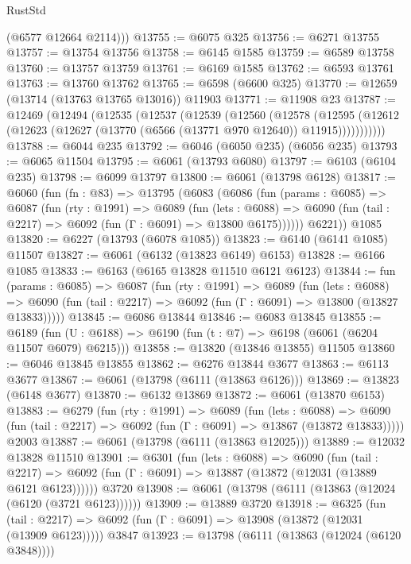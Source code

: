 \begin{lexlean}{RustStd}
\begin{coremodule}
{\begin{coremodule}
{{{{{{{{{{{{{{{{{{{{{{{{{{        (@6577 @12664 @2114)))
@13755 := @6075 @325
@13756 := @6271 @13755
@13757 := @13754 @13756
@13758 := @6145 @1585
@13759 := @6589 @13758
@13760 := @13757 @13759
@13761 := @6169 @1585
@13762 := @6593 @13761
@13763 := @13760 @13762
@13765 := @6598 (@6600 @325)
@13770 := @12659 (@13714 (@13763 @13765 @13016)) @11903
@13771 := @11908 @23
@13787 := @12469
    (@12494
      (@12535
        (@12537
          (@12539
            (@12560
              (@12578
                (@12595
                  (@12612 (@12623 (@12627 (@13770 (@6566 (@13771 @970 @12640)) @11915)))))))))))
@13788 := @6044 @235
@13792 := @6046 (@6050 @235) (@6056 @235)
@13793 := @6065 @11504
@13795 := @6061 (@13793 @6080)
@13797 := @6103 (@6104 @235)
@13798 := @6099 @13797
@13800 := @6061 (@13798 @6128)
@13817 := @6060
    (fun (fn : @83) =>
    @13795
      (@6083
        (@6086
          (fun (params : @6085) =>
          @6087
            (fun (rty : @1991) =>
            @6089
              (fun (lets : @6088) =>
              @6090 (fun (tail : @2217) => @6092 (fun (Γ : @6091) => @13800 @6175))))))
        @6221))
    @1085
@13820 := @6227 (@13793 (@6078 @1085))
@13823 := @6140 (@6141 @1085) @11507
@13827 := @6061 (@6132 (@13823 @6149) @6153)
@13828 := @6166 @1085
@13833 := @6163 (@6165 @13828 @11510 @6121 @6123)
@13844 := fun (params : @6085) =>
  @6087
    (fun (rty : @1991) =>
    @6089
      (fun (lets : @6088) =>
      @6090 (fun (tail : @2217) => @6092 (fun (Γ : @6091) => @13800 (@13827 @13833)))))
@13845 := @6086 @13844
@13846 := @6083 @13845
@13855 := @6189
    (fun (U : @6188) => @6190 (fun (t : @7) => @6198 (@6061 (@6204 @11507 @6079) @6215)))
@13858 := @13820 (@13846 @13855) @11505
@13860 := @6046 @13845 @13855
@13862 := @6276 @13844 @3677
@13863 := @6113 @3677
@13867 := @6061 (@13798 (@6111 (@13863 @6126)))
@13869 := @13823 (@6148 @3677)
@13870 := @6132 @13869
@13872 := @6061 (@13870 @6153)
@13883 := @6279
    (fun (rty : @1991) =>
    @6089
      (fun (lets : @6088) =>
      @6090 (fun (tail : @2217) => @6092 (fun (Γ : @6091) => @13867 (@13872 @13833)))))
    @2003
@13887 := @6061 (@13798 (@6111 (@13863 @12025)))
@13889 := @12032 @13828 @11510
@13901 := @6301
    (fun (lets : @6088) =>
    @6090
      (fun (tail : @2217) =>
      @6092 (fun (Γ : @6091) => @13887 (@13872 (@12031 (@13889 @6121 @6123))))))
    @3720
@13908 := @6061 (@13798 (@6111 (@13863 (@12024 (@6120 (@3721 @6123))))))
@13909 := @13889 @3720
@13918 := @6325
    (fun (tail : @2217) => @6092 (fun (Γ : @6091) => @13908 (@13872 (@12031 (@13909 @6123)))))
    @3847
@13923 := @13798 (@6111 (@13863 (@12024 (@6120 @3848))))
}}}}}}}}}}}}}}}}}}}}}}}}}}
\end{coremodule}}
\end{coremodule}
\end{lexlean}
